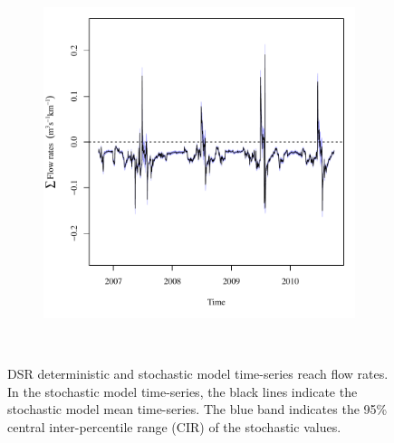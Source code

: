 \begin{landscape}
\begin{figure}
\begin{subfigure}{0.7\textwidth}
			\includegraphics[width=\tableCustomSize]{"Figures/Results_DSR/Stochastic/Balance Water - flow"}
		\end{subfigure}\\
		\caption[DSR deterministic and stochastic model time-series reach flow rates.]{DSR deterministic and stochastic model time-series reach flow rates.  In the stochastic model time-series, the black lines indicate the stochastic model mean time-series.  The blue band indicates the 95\% central inter-percentile range (CIR) of the stochastic values.}
		\label{fig:reachFlow_DS}
	\end{figure}
\end{landscape}

\subtabletop
\begin{table}[htbp]
	\centering
	\caption[USR deterministic and stochastic model time-series reach total average daily flow rate numeric results.]{USR deterministic and stochastic model reach total time-series average daily flow rate numeric results.  Flow rates are presented in units of \si{\cubic\meter\per\second\per\kilo\meter} (\si{\cfs\per\mile}).}
	\label{tab:reachFlow_US}
	
\end{table}
\tablevspace
\begin{table}[htbp]
	\centering
	\caption[DSR deterministic and stochastic model time-series reach total average daily flow rate numeric results.]{DSR deterministic and stochastic model reach total time-series average daily flow rate numeric results.  Flow rates are presented in units of \si{\cubic\meter\per\second\per\kilo\meter} (\si{\cfs\per\mile}).}
	\label{tab:reachFlow_DS}
	
\end{table}

